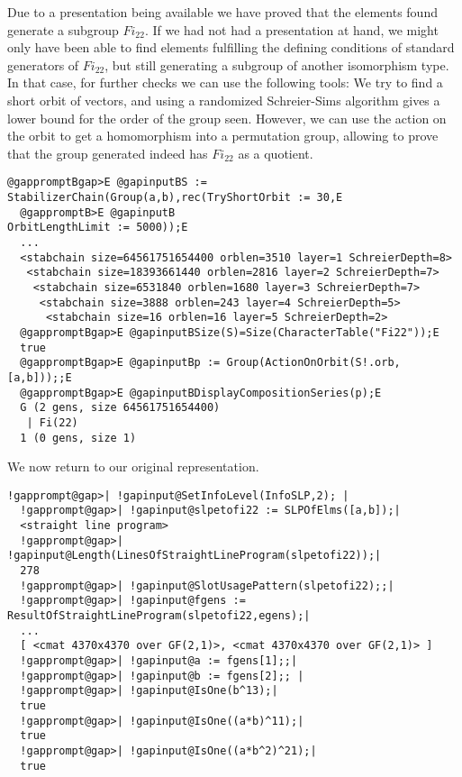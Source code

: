 \documentclass[a4paper,11pt]{report}
\begin{document}
{{ Due to a presentation being available we have proved that the elements found
generate a subgroup $Fi_{{22}}$. If we had not had a presentation at hand, we might only have been able to
find elements fulfilling the defining conditions of standard generators of $Fi_{{22}}$, but still generating a subgroup of another isomorphism type. In that case,
for further checks we can use the following tools: We try to find a short
orbit of vectors, and using a randomized Schreier-Sims algorithm gives a lower
bound for the order of the group seen. However, we can use the action on the
orbit to get a homomorphism into a permutation group, allowing to prove that
the group generated indeed has $Fi_{{22}}$ as a quotient. 
\begin{Verbatim}[commandchars=@BE,fontsize=\small,frame=single,label=Example]
  @gappromptBgap>E @gapinputBS := StabilizerChain(Group(a,b),rec(TryShortOrbit := 30,E
  @gappromptB>E @gapinputB                                       OrbitLengthLimit := 5000));E
  ...
  <stabchain size=64561751654400 orblen=3510 layer=1 SchreierDepth=8>
   <stabchain size=18393661440 orblen=2816 layer=2 SchreierDepth=7>
    <stabchain size=6531840 orblen=1680 layer=3 SchreierDepth=7>
     <stabchain size=3888 orblen=243 layer=4 SchreierDepth=5>
      <stabchain size=16 orblen=16 layer=5 SchreierDepth=2>
  @gappromptBgap>E @gapinputBSize(S)=Size(CharacterTable("Fi22"));E
  true 
  @gappromptBgap>E @gapinputBp := Group(ActionOnOrbit(S!.orb,[a,b]));;E
  @gappromptBgap>E @gapinputBDisplayCompositionSeries(p);E
  G (2 gens, size 64561751654400)
   | Fi(22)
  1 (0 gens, size 1) 
\end{Verbatim}
 

 We now return to our original representation.  
\begin{Verbatim}[commandchars=!@|,fontsize=\small,frame=single,label=Example]
  !gapprompt@gap>| !gapinput@SetInfoLevel(InfoSLP,2); |
  !gapprompt@gap>| !gapinput@slpetofi22 := SLPOfElms([a,b]);|
  <straight line program>
  !gapprompt@gap>| !gapinput@Length(LinesOfStraightLineProgram(slpetofi22));|
  278
  !gapprompt@gap>| !gapinput@SlotUsagePattern(slpetofi22);;|
  !gapprompt@gap>| !gapinput@fgens := ResultOfStraightLineProgram(slpetofi22,egens);|
  ...
  [ <cmat 4370x4370 over GF(2,1)>, <cmat 4370x4370 over GF(2,1)> ] 
  !gapprompt@gap>| !gapinput@a := fgens[1];;|
  !gapprompt@gap>| !gapinput@b := fgens[2];; |
  !gapprompt@gap>| !gapinput@IsOne(b^13);|
  true
  !gapprompt@gap>| !gapinput@IsOne((a*b)^11);|
  true
  !gapprompt@gap>| !gapinput@IsOne((a*b^2)^21);|
  true 
\end{Verbatim}
 

}}
\end{document}

